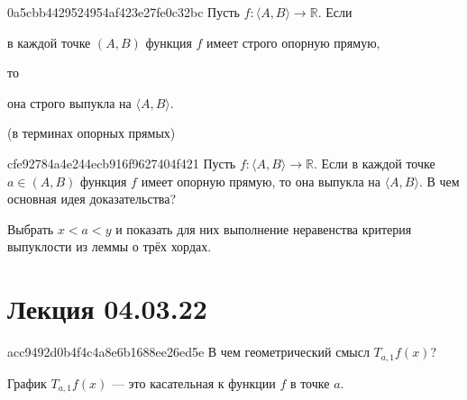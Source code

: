 \begin{note}{0a5cbb4429524954af423e27fe0c32bc}
    Пусть \({ f : \langle A, B \rangle \to \mathbb R }\).
    Если \begin{icloze}{2}в каждой точке \({ (A, B) }\) функция \({ f }\) имеет строго опорную прямую,\end{icloze} то \begin{icloze}{1}она строго выпукла на \({ \langle A, B \rangle }\).\end{icloze}

    \begin{center}
        \tiny
        (в терминах опорных прямых)
    \end{center}
\end{note}

\begin{note}{cfe92784a4e244ecb916f9627404f421}
    Пусть \({ f : \langle A, B \rangle \to \mathbb R }\).
    Если в каждой точке \({ a \in (A, B) }\) функция \({ f }\) имеет опорную прямую, то она выпукла на \({ \langle A, B \rangle }\).
    В чем основная идея доказательства?

    \begin{cloze}{1}
        Выбрать \({ x < a < y }\) и показать для них выполнение неравенства критерия выпуклости из леммы о трёх хордах.
    \end{cloze}
\end{note}

\section{Лекция 04.03.22}
\begin{note}{acc9492d0b4f4c4a8e6b1688ee26ed5e}
    В чем геометрический смысл \( T_{a, 1} f(x) \)?

    \begin{cloze}{1}
        График \( T_{a, 1} f(x) \) --- это касательная к функции \( f \) в точке \( a \).
    \end{cloze}
\end{note}

